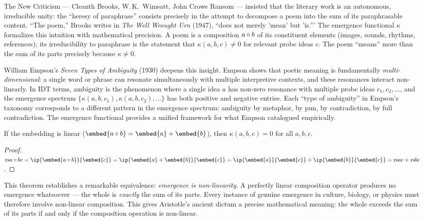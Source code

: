 \begin{interpretation}
\label{interp:ch19:new_criticism_empson}
The New Criticism --- Cleanth Brooks, W.\,K.\ Wimsatt, John Crowe Ransom
--- insisted that the literary work is an autonomous, irreducible unity:
the ``heresy of paraphrase'' consists precisely in the attempt to decompose
a poem into the sum of its paraphrasable content.  ``The poem,'' Brooks
writes in \textit{The Well Wrought Urn} (1947), ``does not merely 'mean'
but 'is.'''  The emergence functional $\kappa$ formalizes this intuition
with mathematical precision.  A poem is a composition $a \circ b$ of
its constituent elements (images, sounds, rhythms, references); its
irreducibility to paraphrase is the statement that $\kappa(a, b, c) \neq 0$
for relevant probe ideas $c$.  The poem ``means'' more than the sum of its
parts precisely because $\kappa \neq 0$.

William Empson's \textit{Seven Types of Ambiguity} (1930) deepens this
insight.  Empson shows that poetic meaning is fundamentally
\emph{multi-dimensional}: a single word or phrase can resonate
simultaneously with multiple interpretive contexts, and these resonances
interact non-linearly.  In IDT terms, ambiguity is the phenomenon where
a single idea $a$ has non-zero resonance with multiple probe ideas
$c_1, c_2, \ldots$, and the emergence spectrum
$\{\kappa(a, b, c_1), \kappa(a, b, c_2), \ldots\}$ has both positive and
negative entries.  Each ``type of ambiguity'' in Empson's taxonomy
corresponds to a different pattern in the emergence spectrum: ambiguity
by metaphor, by pun, by contradiction, by full contradiction.  The
emergence functional provides a unified framework for what Empson
catalogued empirically.
\end{interpretation}

\begin{theorem}
\label{thm:emergence-linearity}
If the embedding is linear ($\embed{a \compose b} = \embed{a} + \embed{b}$),
then $\kappa(a, b, c) = 0$ for all $a, b, c$.
\end{theorem}

\begin{proof}
$\rs{a \compose b}{c} = \ip{\embed{a \compose b}}{\embed{c}} =
\ip{\embed{a} + \embed{b}}{\embed{c}} = \ip{\embed{a}}{\embed{c}} +
\ip{\embed{b}}{\embed{c}} = \rs{a}{c} + \rs{b}{c}$.
\end{proof}

\begin{interpretation}
This theorem establishes a remarkable equivalence: \emph{emergence is
non-linearity}.  A perfectly linear composition operator produces no emergence
whatsoever --- the whole is \emph{exactly} the sum of its parts.  Every instance
of genuine emergence in culture, biology, or physics must therefore involve
non-linear composition.  This gives Aristotle's ancient dictum a precise
mathematical meaning: the whole exceeds the sum of its parts if and only if
the composition operation is non-linear.
\end{interpretation}

